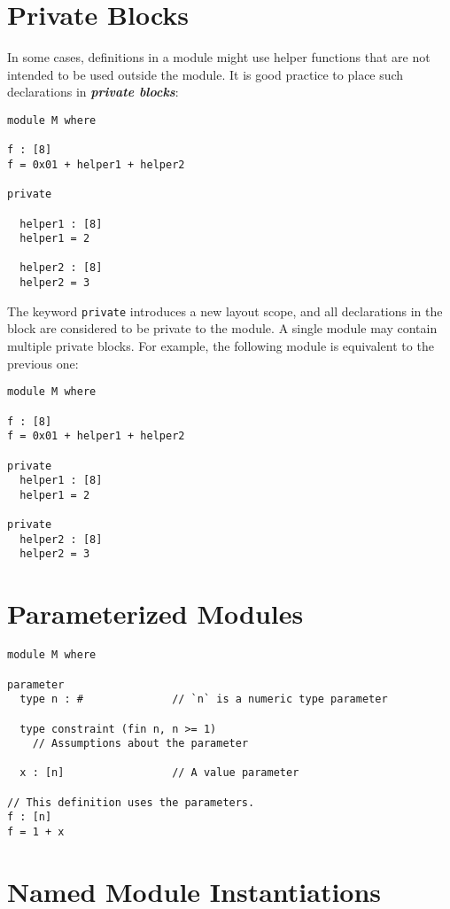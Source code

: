 \section{Private Blocks}\label{private-blocks}

In some cases, definitions in a module might use helper functions that
are not intended to be used outside the module. It is good practice to
place such declarations in \textbf{\emph{private blocks}}:

\begin{verbatim}
module M where

f : [8]
f = 0x01 + helper1 + helper2

private

  helper1 : [8]
  helper1 = 2

  helper2 : [8]
  helper2 = 3
\end{verbatim}

The keyword \texttt{private} introduces a new layout scope, and all
declarations in the block are considered to be private to the module. A
single module may contain multiple private blocks. For example, the
following module is equivalent to the previous one:

\begin{verbatim}
module M where

f : [8]
f = 0x01 + helper1 + helper2

private
  helper1 : [8]
  helper1 = 2

private
  helper2 : [8]
  helper2 = 3
\end{verbatim}

\section{Parameterized Modules}\label{parameterized-modules}

\begin{verbatim}
module M where

parameter
  type n : #              // `n` is a numeric type parameter

  type constraint (fin n, n >= 1)
    // Assumptions about the parameter

  x : [n]                 // A value parameter

// This definition uses the parameters.
f : [n]
f = 1 + x
\end{verbatim}

\section{Named Module Instantiations}\label{named-module-instantiations}

